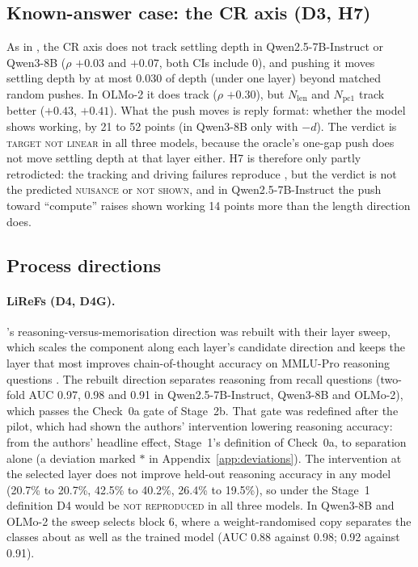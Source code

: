 \documentclass[11pt]{article}
\newcommand{\verdict}[1]{\textsc{\MakeLowercase{#1}}}
\begin{document}
\subsection{Known-answer case: the CR axis (D3, H7)}
As in \citet{ramdan2026crv2}, the CR axis does not track settling depth in Qwen2.5-7B-Instruct or Qwen3-8B ($\rho$ $+0.03$ and $+0.07$, both CIs include 0), and pushing it moves settling depth by at most 0.030 of depth (under one layer) beyond matched random pushes. In OLMo-2 it does track ($\rho$ $+0.30$), but $N_\text{len}$ and $N_\text{pc1}$ track better ($+0.43$, $+0.41$). What the push moves is reply format: whether the model shows working, by 21 to 52 points (in Qwen3-8B only with $-d$). The verdict is \verdict{TARGET NOT LINEAR} in all three models, because the oracle's one-gap push does not move settling depth at that layer either. H7 is therefore only partly retrodicted: the tracking and driving failures reproduce \citet{ramdan2026crv2}, but the verdict is not the predicted \verdict{NUISANCE} or \verdict{NOT SHOWN}, and in Qwen2.5-7B-Instruct the push toward ``compute'' raises shown working 14 points more than the length direction does.

\subsection{Process directions}

\paragraph{LiReFs (D4, D4G).} \citet{hong2025lirefs}'s reasoning-versus-memorisation direction was rebuilt with their layer sweep, which scales the component along each layer's candidate direction and keeps the layer that most improves chain-of-thought accuracy on MMLU-Pro reasoning questions \citep{wang2024mmlupro}. The rebuilt direction separates reasoning from recall questions (two-fold AUC 0.97, 0.98 and 0.91 in Qwen2.5-7B-Instruct, Qwen3-8B and OLMo-2), which passes the Check~0a gate of Stage~2b. That gate was redefined after the pilot, which had shown the authors' intervention lowering reasoning accuracy: from the authors' headline effect, Stage~1's definition of Check~0a, to separation alone (a deviation marked $\ast$ in Appendix~\ref{app:deviations}). The intervention at the selected layer does not improve held-out reasoning accuracy in any model (20.7\% to 20.7\%, 42.5\% to 40.2\%, 26.4\% to 19.5\%), so under the Stage~1 definition D4 would be \verdict{NOT REPRODUCED} in all three models. In Qwen3-8B and OLMo-2 the sweep selects block 6, where a weight-randomised copy separates the classes about as well as the trained model (AUC 0.88 against 0.98; 0.92 against 0.91).
\end{document}
